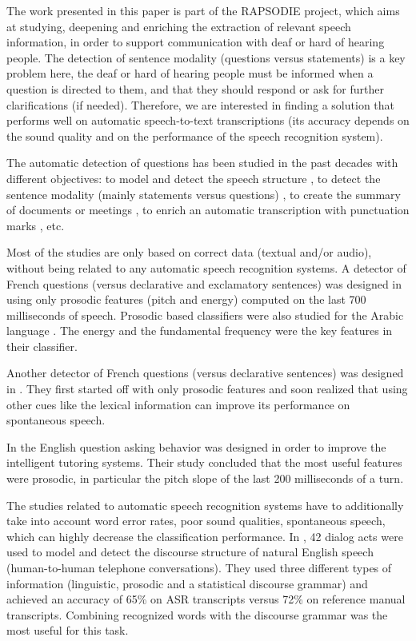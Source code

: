 \documentclass[conference]{IEEEtran}
\begin{document}
The work presented in this paper is part of the RAPSODIE project, which aims at studying, deepening and enriching the extraction of relevant speech information, in order to support communication with deaf or hard of hearing people. 
The detection of sentence modality (questions versus statements) is a key problem here, the deaf or hard of hearing people must be informed when a question is directed to them, and that they should respond or ask for further clarifications (if needed). 
Therefore, we are interested in finding a solution that performs well on automatic speech-to-text transcriptions (its accuracy depends on the sound quality and on the performance of the speech recognition system).

The automatic detection of questions has been studied in the past decades with different objectives: to model and detect the speech structure \cite{Jurafsky:1997}, to detect the sentence modality (mainly statements versus questions) \cite{Kral:2005, Yuan:2005, Quang:2006, Quang:2007, Khan:2010, Margolis:2011}, to create the summary of documents or meetings \cite{Quang:2006}, to enrich an automatic transcription with punctuation marks \cite{Kolar:2012}, etc.

Most of the studies are only based on correct data (textual and/or audio), without being related to any automatic speech recognition systems.  
A detector of French questions (versus declarative and exclamatory sentences) was designed in \cite{Kral:2005} using only prosodic features (pitch and energy) computed on the last 700 milliseconds of speech.
Prosodic based classifiers were also studied for the Arabic language \cite{Khan:2010}. The energy and the fundamental frequency were the key features in their classifier. 

Another detector of French questions (versus declarative sentences) was designed in \cite{Quang:2006, Quang:2007}. They first started off with only prosodic features and soon realized that using other cues like the lexical information can improve its performance on spontaneous speech.

In \cite{Liscombe:2006} the English question asking behavior was designed in order to improve the intelligent tutoring systems. Their study concluded that the most useful features were prosodic, in particular the pitch slope of the last 200 milliseconds of a turn. 

The studies related to automatic speech recognition systems have to additionally take into account word error rates, poor sound qualities, spontaneous speech, which can highly decrease the classification performance.
In \cite{Jurafsky:1997}, 42 dialog acts were used to model and detect the discourse structure of natural English speech (human-to-human telephone conversations). They used three different types of information (linguistic, prosodic and a statistical discourse grammar) and achieved an accuracy of 65\% on ASR transcripts versus 72\% on reference manual transcripts. Combining recognized words with the discourse grammar was the most useful for this task. 
\end{document}
